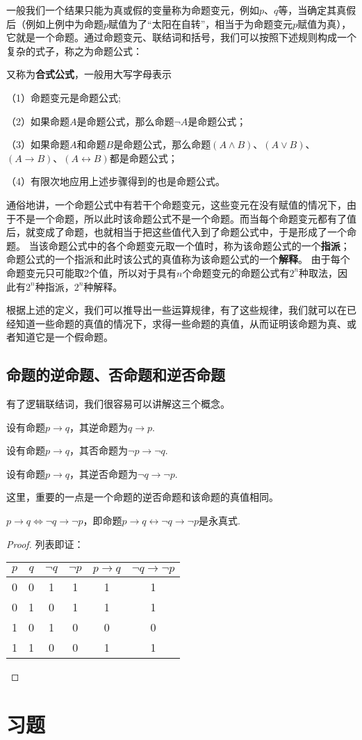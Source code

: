 一般我们一个结果只能为真或假的变量称为命题变元，例如$p$、$q$等，当确定其真假后（例如上例中为命题$p$赋值为了“太阳在自转”，相当于为命题变元$p$赋值为真），它就是一个命题。通过命题变元、联结词和括号，我们可以按照下述规则构成一个复杂的式子，称之为命题公式：
\begin{definition}[命题公式]
    又称为\textbf{合式公式}，一般用大写字母表示

    （1）命题变元是命题公式;

    （2）如果命题$A$是命题公式，那么命题$\neg A$是命题公式；

    （3）如果命题$A$和命题$B$是命题公式，那么命题$(A \wedge B)$、$(A \vee B)$、$(A \to B)$、$(A \leftrightarrow B)$都是命题公式；
    
    （4）有限次地应用上述步骤得到的也是命题公式。
\end{definition}

通俗地讲，一个命题公式中有若干个命题变元，这些变元在没有赋值的情况下，由于不是一个命题，所以此时该命题公式不是一个命题。而当每个命题变元都有了值后，就变成了命题，也就相当于把这些值代入到了命题公式中，于是形成了一个命题。
当该命题公式中的各个命题变元取一个值时，称为该命题公式的一个\textbf{指派}；命题公式的一个指派和此时该公式的真值称为该命题公式的一个\textbf{解释}。
由于每个命题变元只可能取2个值，所以对于具有$n$个命题变元的命题公式有$2^n$种取法，因此有$2^n$种指派，$2^n$种解释。

根据上述的定义，我们可以推导出一些运算规律，有了这些规律，我们就可以在已经知道一些命题的真值的情况下，求得一些命题的真值，从而证明该命题为真、或者知道它是一个假命题。

\subsection{命题的逆命题、否命题和逆否命题}
有了逻辑联结词，我们很容易可以讲解这三个概念。 
\begin{definition}[逆命题]
    设有命题$p \to q$，其逆命题为$q \to p$.
\end{definition}
\begin{definition}[否命题]
    设有命题$p \to q$，其否命题为$\neg p \to \neg q$.
\end{definition}
\begin{definition}[逆否命题]
    设有命题$p \to q$，其逆否命题为$\neg q \to \neg p$.
\end{definition}
这里，重要的一点是一个命题的逆否命题和该命题的真值相同。
\begin{theorem}
    $p \to q \iff \neg q \to \neg p$，即命题$p \to q \leftrightarrow \neg q \to \neg p$是永真式.
\end{theorem}
\begin{proof}
    列表即证：

    \begin{tabular}{c|c|c|c|c|c}
        $p$ & $q$ & $\neg q$ & $\neg p$ & $p \to q$ & $\neg q \to \neg p$ \\
        \hline
        0 & 0 & 1 & 1 & 1 & 1 \\
        0 & 1 & 0 & 1 & 1 & 1 \\
        1 & 0 & 1 & 0 & 0 & 0 \\
        1 & 1 & 0 & 0 & 1 & 1
    \end{tabular}
\end{proof}

\section*{习题 \thesection}
